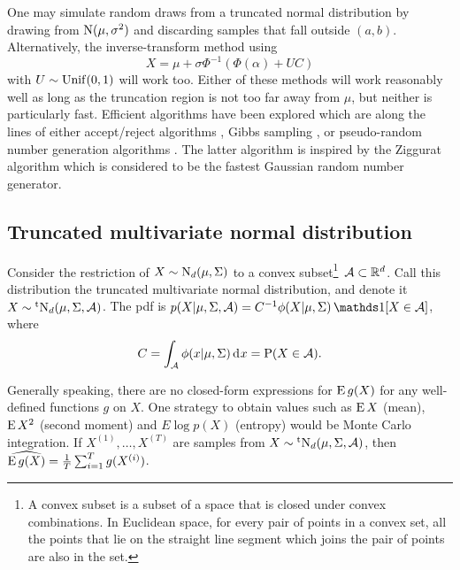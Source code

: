 One may simulate random draws from a truncated normal distribution by drawing from $\operatorname{N}(\mu,\sigma^2)$ and discarding samples that fall outside $(a,b)$.
Alternatively, the inverse-transform method using
\[
  X = \mu + \sigma\Phi^{-1}\left( \Phi(\alpha) + UC \right)
\]
with $U\sim\operatorname{Unif}(0,1)$ will work too.
Either of these methods will work reasonably well as long as the truncation region is not too far away from $\mu$, but neither is particularly fast.
Efficient algorithms have been explored which are along the lines of either accept/reject algorithms \citep{robert1995simulation}, Gibbs sampling \citep{damien2001sampling}, or pseudo-random number generation algorithms \citep{chopin2011fast}.
The latter algorithm is inspired by the Ziggurat algorithm \citep{marsaglia2000ziggurat} which is considered to be the fastest Gaussian random number generator.


\subsection{Truncated multivariate normal distribution}

Consider the restriction of $X\sim \operatorname{N}_d(\mu,\Sigma)$ to a convex subset\footnote{A convex subset is a subset of a space that is closed under convex combinations. In Euclidean space, for every pair of points in a convex set, all the points that lie on the straight line segment which joins the pair of points are also in the set.}~${\mathcal A} \subset \mathbb{R}^d$.
Call this distribution the truncated multivariate normal distribution, and denote it $X \sim \operatorname{{}^tN}_d(\mu,\Sigma,{\mathcal A})$.
The pdf is $p(X|\mu,\Sigma,\cA) = C^{-1}\phi(X|\mu,\Sigma)\ind[X\in\cA]$, where
\[
  C = \int_{\mathcal A} \phi(x|\mu,\Sigma) \operatorname{d}\hspace{0.5pt}\! x = \operatorname{P}(X \in {\mathcal A}).
\] 

Generally speaking, there are no closed-form expressions for $\operatorname{E} g(X)$ for any well-defined functions $g$ on $X$.
One strategy to obtain values such as $\operatorname{E} X$ (mean), $\operatorname{E} X^2$ (second moment) and $E \log p(X)$ (entropy) would be Monte Carlo integration.
If $X^{(1)},\dots,X^{(T)}$ are samples from $X\sim\operatorname{{}^tN}_d(\mu,\Sigma,{\mathcal A})$, then $\widehat{\operatorname{E} g(X)} = \frac{1}{T} \sum_{i=1}^T g(X^{(i)})$.

